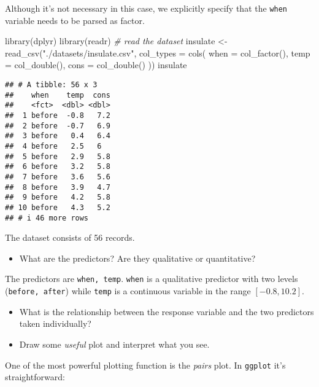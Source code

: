 \documentclass[
  oneside]{book}
\newenvironment{Shaded}{\begin{snugshade}}{\end{snugshade}}
\newcommand{\AttributeTok}[1]{\textcolor[rgb]{0.77,0.63,0.00}{#1}}
\newcommand{\CommentTok}[1]{\textcolor[rgb]{0.56,0.35,0.01}{\textit{#1}}}
\newcommand{\FunctionTok}[1]{\textcolor[rgb]{0.00,0.00,0.00}{#1}}
\newcommand{\NormalTok}[1]{#1}
\newcommand{\OtherTok}[1]{\textcolor[rgb]{0.56,0.35,0.01}{#1}}
\newcommand{\StringTok}[1]{\textcolor[rgb]{0.31,0.60,0.02}{#1}}
\providecommand{\tightlist}{%
  \setlength{\itemsep}{0pt}\setlength{\parskip}{0pt}}
\begin{document}
Although it's not necessary in this case, we explicitly specify
that the \texttt{when} variable needs to be parsed as factor.

\begin{Shaded}
\begin{Highlighting}[]
\FunctionTok{library}\NormalTok{(dplyr)}
\FunctionTok{library}\NormalTok{(readr)}
\CommentTok{\# read the dataset}
\NormalTok{insulate }\OtherTok{\textless{}{-}} \FunctionTok{read\_csv}\NormalTok{(}\StringTok{"./datasets/insulate.csv"}\NormalTok{, }\AttributeTok{col\_types =} \FunctionTok{cols}\NormalTok{(}
  \AttributeTok{when =} \FunctionTok{col\_factor}\NormalTok{(),}
  \AttributeTok{temp =} \FunctionTok{col\_double}\NormalTok{(),}
  \AttributeTok{cons =} \FunctionTok{col\_double}\NormalTok{()}
\NormalTok{))}
\NormalTok{insulate}
\end{Highlighting}
\end{Shaded}

\begin{verbatim}
## # A tibble: 56 x 3
##    when    temp  cons
##    <fct>  <dbl> <dbl>
##  1 before  -0.8   7.2
##  2 before  -0.7   6.9
##  3 before   0.4   6.4
##  4 before   2.5   6  
##  5 before   2.9   5.8
##  6 before   3.2   5.8
##  7 before   3.6   5.6
##  8 before   3.9   4.7
##  9 before   4.2   5.8
## 10 before   4.3   5.2
## # i 46 more rows
\end{verbatim}

The dataset consists of 56 records.

\begin{itemize}
\tightlist
\item
  What are the predictors? Are they qualitative or quantitative?
\end{itemize}

The predictors are \texttt{when,\ temp}.
\texttt{when} is a qualitative predictor with two levels (\texttt{before,\ after})
while \texttt{temp} is a continuous variable in the range \([-0.8, 10.2]\).

\begin{itemize}
\tightlist
\item
  What is the relationship between the response variable and the two
  predictors taken individually?
\item
  Draw some \emph{useful} plot and interpret what you see.
\end{itemize}

One of the most powerful plotting function is the \emph{pairs} plot.
In \texttt{ggplot} it's straightforward:
\end{document}
